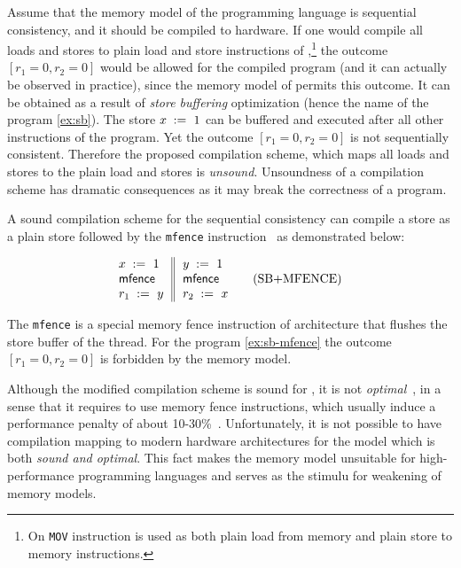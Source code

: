 Assume that the memory model of the programming language
is sequential consistency, and 
it should be compiled to \Intel hardware. 
If one would compile all loads and stores 
to plain load and store instructions of \Intel,\footnote{
On \Intel \texttt{MOV} instruction 
is used as both plain load from memory and 
plain store to memory instructions.}
the outcome $[r_1=0, r_2=0]$ would be 
allowed for the compiled program 
(and it can actually be observed in practice), 
since the memory model of \Intel permits this outcome. 
It can be obtained as a result of \emph{store buffering}
optimization (hence the name of the program \ref{ex:sb}). 
The store ${x\;:=_{}\;1}$ can be buffered and 
executed after all other instructions of the program.  
Yet the outcome ${[r_1=0, r_2=0]}$ is not sequentially consistent. 
Therefore the proposed compilation scheme, 
which maps all loads and stores to the 
plain load and stores is \emph{unsound}. 
Unsoundness of a compilation scheme has 
dramatic consequences as it may break 
the correctness of a program. 

A sound compilation scheme for the sequential consistency 
can compile a store as a plain store followed 
by the \texttt{mfence} instruction~\cite{Sewell-al:CACM10, Batty-al:POPL11} 
as demonstrated below: 

\begin{equation*}
\inarrII{
   \writeInst{}{x}{1}   \\
   \mfenceInst          \\
   \readInst{}{r_1}{y}  \\
}{
  \writeInst{}{y}{1}   \\
  \mfenceInst          \\
  \readInst{}{r_2}{x}  \\
}
\tag{SB+MFENCE}\label{ex:sb-mfence}
\end{equation*}


The \texttt{mfence} is a special memory fence instruction
of \Intel architecture that flushes the store buffer of the thread. 
For the program \ref{ex:sb-mfence} the outcome $[r_1=0, r_2=0]$
is forbidden by the \Intel memory model. 

Although the modified compilation scheme is sound for \SC, 
it is not \emph{optimal}~\cite{OptimalCompilationCPP}, 
in a sense that it requires to use memory fence instructions, 
which usually induce a performance penalty
of about 10-30\%~\cite{Marino-al:PLDI11, Liu-al:OOPSLA17}.
Unfortunately, it is not possible to have compilation mapping 
to modern hardware architectures     
for the \SC model which is both \emph{sound and optimal}. 
This fact makes the \SC memory model unsuitable  
for high-performance programming languages
and serves as the stimulu for 
weakening of memory models. 
 
